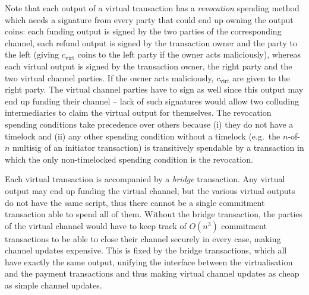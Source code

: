   Note that each output of a virtual transaction has a \emph{revocation} spending
  method which needs a signature from every party that could end up owning the
  output coins: each funding output is signed by the two parties of the
  corresponding channel, each refund output is signed by the transaction owner
  and the party to the left (giving $c_{\mathrm{virt}}$ coins to the left party
  if the owner acts maliciously), whereas each virtual output is signed by the
  transaction owner, the right party and the two virtual channel parties. If the
  owner acts maliciously, $c_{\mathrm{virt}}$ are given to the right party. The
  virtual channel parties have to sign as well since this output may end up
  funding their channel -- lack of such signatures would allow two colluding
  intermediaries to claim the virtual output for themselves. The revocation
  spending conditions take precedence over others because (i) they do not have a
  timelock and (ii) any other spending condition without a timelock (e.g.\ the
  $n$-of-$n$ multisig of an initiator transaction) is transitively spendable by
  a transaction in which the only non-timelocked spending condition is the
  revocation.

  Each virtual transaction is accompanied by a \emph{bridge} transaction. Any
  virtual output may end up funding the virtual channel, but the various virtual
  outputs do not have the same script, thus there cannot be a single commitment
  transaction able to spend all of them. Without the bridge transaction, the
  parties of the virtual channel would have to keep track of $O(n^3)$ commitment
  transactions to be able to close their channel securely in every case, making
  channel updates expensive. This is fixed by the bridge transactions, which all
  have exactly the same output, unifying the interface between the
  virtualisation and the payment transactions and thus making virtual channel
  updates as cheap as simple channel updates.

